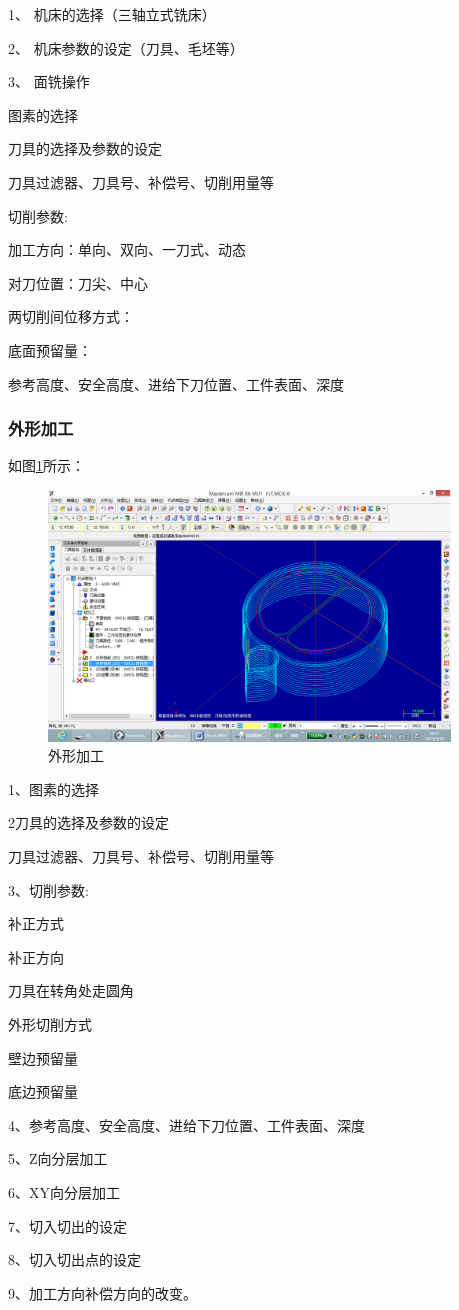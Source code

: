1、	机床的选择（三轴立式铣床）\par
2、	机床参数的设定（刀具、毛坯等）\par
3、	面铣操作\par
图素的选择\par
刀具的选择及参数的设定\par
刀具过滤器、刀具号、补偿号、切削用量等\par
切削参数:\par
加工方向：单向、双向、一刀式、动态\par
对刀位置：刀尖、中心\par
两切削间位移方式：\par
底面预留量：\par
参考高度、安全高度、进给下刀位置、工件表面、深度\par
\subsubsection{外形加工}
如图\ref{外形加工}所示：
\begin{figure}[!hbtp]
	\centering	\includegraphics[width=0.95\textwidth]{images/15-3}
	\caption{外形加工} \label{外形加工}
\end{figure}
1、图素的选择\par
2刀具的选择及参数的设定\par
刀具过滤器、刀具号、补偿号、切削用量等\par
3、切削参数:\par
补正方式\par
补正方向\par
刀具在转角处走圆角\par
外形切削方式\par
壁边预留量\par
底边预留量\par
4、参考高度、安全高度、进给下刀位置、工件表面、深度\par
5、Z向分层加工\par
6、XY向分层加工\par
7、切入切出的设定\par
8、切入切出点的设定\par
9、加工方向补偿方向的改变。\par
